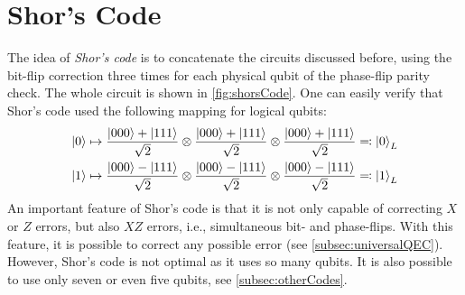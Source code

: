 	\section{Shor's Code}
		The idea of \emph{Shor's code} is to concatenate the circuits discussed before, using the bit-flip correction three times for each physical qubit of the phase-flip parity check. The whole circuit is shown in \autoref{fig:shorsCode}. One can easily verify that Shor's code used the following mapping for logical qubits:
		\begin{equation}
			\begin{aligned}
				\ket{0} & \mapsto \frac{\ket{000} + \ket{111}}{\sqrt{2}} \otimes \frac{\ket{000} + \ket{111}}{\sqrt{2}} \otimes \frac{\ket{000} + \ket{111}}{\sqrt{2}} \eqqcolon \ket{0}_L \\
				\ket{1} & \mapsto \frac{\ket{000} - \ket{111}}{\sqrt{2}} \otimes \frac{\ket{000} - \ket{111}}{\sqrt{2}} \otimes \frac{\ket{000} - \ket{111}}{\sqrt{2}} \eqqcolon \ket{1}_L
			\end{aligned}
			\label{eq:shorCode}
		\end{equation}
		An important feature of Shor's code is that it is not only capable of correcting \(X\) or \(Z\) errors, but also \(XZ\) errors, i.e., simultaneous bit- and phase-flips. With this feature, it is possible to correct any possible error (see \autoref{subsec:universalQEC}). However, Shor's code is not optimal as it uses so many qubits. It is also possible to use only seven or even five qubits, see \autoref{subsec:otherCodes}.

